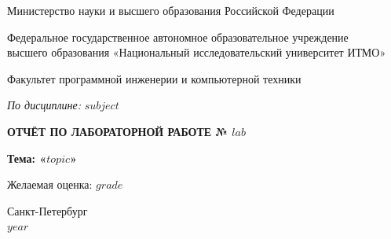 \begin{titlepage}
\begin{center}

Министерство науки и высшего образования Российской Федерации

\vspace{0.5cm}

Федеральное государственное автономное образовательное учреждение\\
высшего образования «Национальный исследовательский университет ИТМО»

Факультет программной инженерии и компьютерной техники

\vspace{0.5cm}

\textit{По дисциплине:} $subject$

\vfill

{\Large\bfseries ОТЧЁТ ПО ЛАБОРАТОРНОЙ РАБОТЕ № $lab$}

\vspace{1cm}

{\large\bfseries Тема: «$topic$»}

\vfill
\end{center}

\begin{flushright}
Желаемая оценка: $grade$
\end{flushright}

\vfill

\begin{center}
Санкт-Петербург\\
$year$
\end{center}

\end{titlepage}

\newpage
